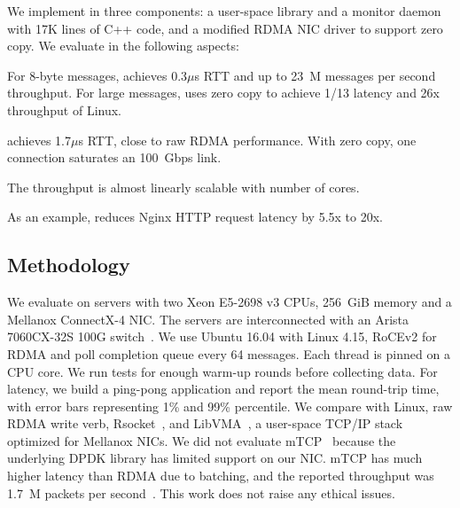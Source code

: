 We implement \sys in three components: a user-space library \libipc{} and a monitor daemon with 17K lines of C++ code, and a modified RDMA NIC driver to support zero copy. We evaluate \sys in the following aspects:

For 8-byte messages, \sys achieves 0.3$\mu$s RTT and up to 23~M messages per second throughput. For large messages, \sys uses zero copy to achieve 1/13 latency and 26x throughput of Linux.

\sys achieves 1.7$\mu$s RTT, close to raw RDMA performance.
With zero copy, one connection saturates an 100~Gbps link.


The throughput is almost linearly scalable with number of cores. %


As an example, \sys{} reduces Nginx HTTP request latency by 5.5x to 20x.


\subsection{Methodology}
\label{subsec:methodology}

We evaluate \sys on servers with two Xeon E5-2698 v3 CPUs, 256~GiB memory and a Mellanox ConnectX-4 NIC. The servers are interconnected with an Arista 7060CX-32S 100G switch~\cite{arista-7060cx}. We use Ubuntu 16.04 with Linux 4.15, RoCEv2 for RDMA and poll completion queue every 64 messages.
Each thread is pinned on a CPU core. We run tests for enough warm-up rounds before collecting data.
For latency, we build a ping-pong application and report the mean round-trip time, with error bars representing 1\% and 99\% percentile.
We compare with Linux, raw RDMA write verb, Rsocket~\cite{rsockets}, and LibVMA~\cite{libvma}, a user-space TCP/IP stack optimized for Mellanox NICs.
We did not evaluate mTCP~\cite{jeong2014mtcp} because the underlying DPDK library has limited support on our NIC. mTCP has much higher latency than RDMA due to batching, and the reported throughput was 1.7~M packets per second~\cite{kalia2018datacenter}. %
This work does not raise any ethical issues.

